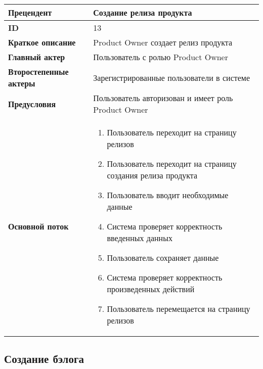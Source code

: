 \documentclass[14pt,a4paper]{extarticle}
\begin{document}
\begin{tabular}{|l|p{9cm}|}
	\hline
	\textbf{Прецендент}            & Создание релиза продукта                                              	      \\
	\hline
	\textbf{ID}                    & 13                                                                           \\
	\hline
	\textbf{Краткое описание}      & Product Owner создает релиз продукта               		     	      \\
	\hline
	\textbf{Главный актер}         & Пользователь с ролью Product Owner                                           \\
	\hline
	\textbf{Второстепенные актеры} & Зарегистрированные пользователи в системе                                    \\
	\hline
	\textbf{Предусловия}           & Пользователь авторизован и имеет роль Product Owner                          \\
	\hline
	\textbf{Основной поток}        & \begin{enumerate}
		                                 \item Пользователь переходит на страницу релизов
		                                 \item Пользователь переходит на страницу создания релиза продукта
						 \item Пользователь вводит необходимые данные
					         \item Система проверяет корректность введенных данных
						 \item Пользователь сохраняет данные
		                                 \item Система проверяет корректность произведенных действий
						 \item Пользователь перемещается на страницу релизов
	                                 \end{enumerate} \\
	\hline
\end{tabular}

\subsection{Создание бэлога}
\end{document}
